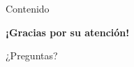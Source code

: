 \documentclass{beamer}
\begin{document}
\begin{frame}
    \titlepage
\end{frame}

\begin{frame}{Contenido}
    \tableofcontents
\end{frame}







\begin{frame}
    \centering
    \Huge \textbf{¡Gracias por su atención!}
    
    \vspace{1em}
    
    \Large ¿Preguntas?
\end{frame}
\end{document}
